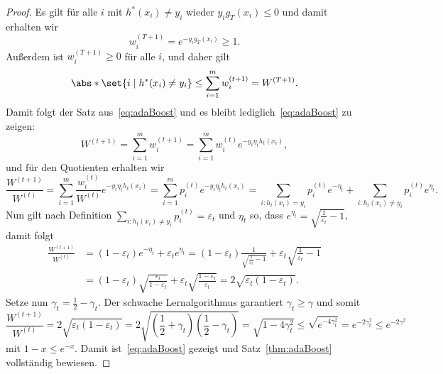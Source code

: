 \documentclass[language=ngerman,algolist,acrolist]{TemplateLecture}
\begin{document}
\begin{proof}
    Es gilt für alle $i$ mit $h^*(x_i) \neq y_i$ wieder $y_i g_T(x_i) \leq 0$ und damit erhalten wir 
    \begin{equation*}
        w_i^{(T + 1)} = e^{-y_i g_T(x_i)} \geq 1.
    \end{equation*}
    Außerdem ist $w_i^{(T + 1)} \geq 0$ für alle $i$, und daher gilt 
    \begin{equation*}
        \abs*{\set{i \mid h^*(x_i) \neq y_i}} \leq \sum_{i = 1}^m w_i^{(t + 1)} = W^{(T + 1)}.
    \end{equation*}
    Damit folgt der Satz aus~\eqref{eq:adaBoost} und es bleibt lediglich~\eqref{eq:adaBoost} zu zeigen:
    \begin{equation*}
        W^{(t + 1)} = \sum_{i = 1}^m w_i^{(t + 1)} = \sum_{i = 1}^m w_i^{(t)} e^{-y_i \eta_t h_t(x_i)},
    \end{equation*}
    und für den Quotienten erhalten wir 
    \begin{equation*}
        \frac{W^{(t + 1)}}{W^{(t)}} = \sum_{i = 1}^m \frac{w_i^{(t)}}{W^{(t)}} e^{-y_i \eta_t h_t(x_i)} = \sum_{i = 1}^m p_i^{(t)} e^{-y_i \eta_t h_t(x_i)} = \sum_{i: h_t(x_i) = y_i} p_i^{(t)} e^{-\eta_t} + \sum_{i: h_t(x_i) \neq y_i} p_i^{(t)} e^{\eta_t}.
    \end{equation*}
    Nun gilt nach Definition $\sum_{i: h_t(x_i) \neq y_i} p_i^{(t)} = \varepsilon_t$ und $\eta_t$ so, dass $e^{\eta_t} = \sqrt{\frac{1}{\varepsilon_t} - 1}$, damit folgt
    \begin{equation*}
        \begin{split}
            \frac{W^{(t + 1)}}{W^{(t)}} &= (1 - \varepsilon_t) e^{-\eta_t} + \varepsilon_t e^{\eta_t} = (1 - \varepsilon_t) \frac{1}{\sqrt{\frac{1}{\varepsilon_t} - 1}} + \varepsilon_t \sqrt{\frac{1}{\varepsilon_t} - 1} \\
            &= (1 - \varepsilon_t) \sqrt{\frac{\varepsilon_t}{1 - \varepsilon_t}} + \varepsilon_t \sqrt{\frac{1 - \varepsilon_t}{\varepsilon_t}} = 2\sqrt{\varepsilon_t(1-\varepsilon_t)}.
        \end{split}
    \end{equation*}
    Setze nun $\gamma_t = \frac{1}{2}-\gamma_t$. Der schwache Lernalgorithmus garantiert $\gamma_t \geq \gamma$ und somit 
    \begin{equation*}
        \frac{W^{(t + 1)}}{W^{(t)}} = 2\sqrt{\varepsilon_t(1-\varepsilon_t)} = 2\sqrt{\left( \frac{1}{2}  + \gamma_t \right)\left(\frac{1}{2} - \gamma_t\right)} = \sqrt{1 - 4\gamma_t^2} \leq \sqrt{e^{-4\gamma_t^2}} = e^{-2\gamma_t^2} \leq e^{-2\gamma^2}
    \end{equation*}
    mit $1 - x \leq e^{-x}$. Damit ist~\eqref{eq:adaBoost} gezeigt und Satz~\ref{thm:adaBoost} vollständig bewiesen.
\end{proof} 
\end{document}
